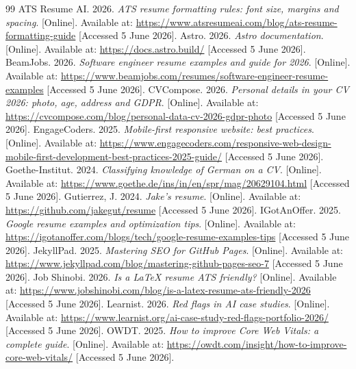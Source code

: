 \documentclass[11pt,a4paper]{article}
\begin{document}
\begingroup
\raggedright
\begin{thebibliography}{99}
 ATS Resume AI. 2026. \textit{ATS resume formatting rules: font size, margins and spacing}. [Online]. Available at: \url{https://www.atsresumeai.com/blog/ats-resume-formatting-guide} [Accessed 5 June 2026].
 Astro. 2026. \textit{Astro documentation}. [Online]. Available at: \url{https://docs.astro.build/} [Accessed 5 June 2026].
 BeamJobs. 2026. \textit{Software engineer resume examples and guide for 2026}. [Online]. Available at: \url{https://www.beamjobs.com/resumes/software-engineer-resume-examples} [Accessed 5 June 2026].
 CVCompose. 2026. \textit{Personal details in your CV 2026: photo, age, address and GDPR}. [Online]. Available at: \url{https://cvcompose.com/blog/personal-data-cv-2026-gdpr-photo} [Accessed 5 June 2026].
 EngageCoders. 2025. \textit{Mobile-first responsive website: best practices}. [Online]. Available at: \url{https://www.engagecoders.com/responsive-web-design-mobile-first-development-best-practices-2025-guide/} [Accessed 5 June 2026].
 Goethe-Institut. 2024. \textit{Classifying knowledge of German on a CV}. [Online]. Available at: \url{https://www.goethe.de/ins/in/en/spr/mag/20629104.html} [Accessed 5 June 2026].
 Gutierrez, J. 2024. \textit{Jake's resume}. [Online]. Available at: \url{https://github.com/jakegut/resume} [Accessed 5 June 2026].
 IGotAnOffer. 2025. \textit{Google resume examples and optimization tips}. [Online]. Available at: \url{https://igotanoffer.com/blogs/tech/google-resume-examples-tips} [Accessed 5 June 2026].
 JekyllPad. 2025. \textit{Mastering SEO for GitHub Pages}. [Online]. Available at: \url{https://www.jekyllpad.com/blog/mastering-github-pages-seo-7} [Accessed 5 June 2026].
 Job Shinobi. 2026. \textit{Is a \LaTeX{} resume ATS friendly?} [Online]. Available at: \url{https://www.jobshinobi.com/blog/is-a-latex-resume-ats-friendly-2026} [Accessed 5 June 2026].
 Learnist. 2026. \textit{Red flags in AI case studies}. [Online]. Available at: \url{https://www.learnist.org/ai-case-study-red-flags-portfolio-2026/} [Accessed 5 June 2026].
 OWDT. 2025. \textit{How to improve Core Web Vitals: a complete guide}. [Online]. Available at: \url{https://owdt.com/insight/how-to-improve-core-web-vitals/} [Accessed 5 June 2026].

\end{thebibliography}
\end{document}
